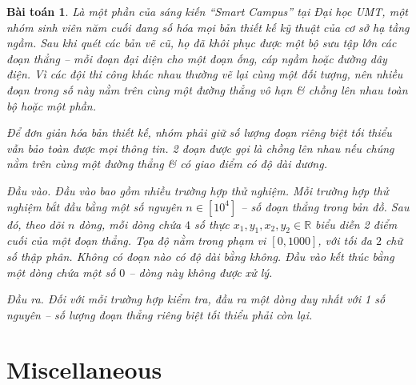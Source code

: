 \documentclass{article}
\newtheorem{baitoan}{Bài toán}
\begin{document}
 \begin{baitoan}
     Là một phần của sáng kiến ``Smart Campus'' tại Đại học UMT, một nhóm sinh viên năm cuối đang số hóa mọi bản thiết kế kỹ thuật của cơ sở hạ tầng ngầm. Sau khi quét các bản vẽ cũ, họ đã khôi phục được một bộ sưu tập lớn các đoạn thẳng -- mỗi đoạn đại diện cho một đoạn ống, cáp ngầm hoặc đường dây điện. Vì các đội thi công khác nhau thường vẽ lại cùng một đối tượng, nên nhiều đoạn trong số này nằm trên {\rm cùng một} đường thẳng vô hạn \& chồng lên nhau toàn bộ hoặc một phần.
     
     Để đơn giản hóa bản thiết kế, nhóm phải giữ {\rm số lượng đoạn riêng biệt tối thiểu} vẫn bảo toàn được mọi thông tin. 2 đoạn được gọi là {\rm chồng lên nhau} nếu chúng nằm trên cùng một đường thẳng \& có giao điểm có độ dài dương.
     \item {\sf Đầu vào.} Đầu vào bao gồm nhiều trường hợp thử nghiệm. Mỗi trường hợp thử nghiệm bắt đầu bằng một số nguyên $n\in[10^4]$ -- số đoạn thẳng trong bản đồ. Sau đó, theo dõi $n$ dòng, mỗi dòng chứa $4$ số thực $x_1,y_1,x_2,y_2\in\mathbb{R}$ biểu diễn 2 điểm cuối của một đoạn thẳng. Tọa độ nằm trong phạm vi $[0,1000]$, với tối đa $2$ chữ số thập phân. Không có đoạn nào có độ dài bằng không. Đầu vào kết thúc bằng một dòng chứa một số $0$ -- dòng này không được xử lý.
     \item {\sf Đầu ra.} Đối với mỗi trường hợp kiểm tra, đầu ra một dòng duy nhất với 1 số nguyên -- số lượng đoạn thẳng riêng biệt tối thiểu phải còn lại.
 \end{baitoan}
 


\section{Miscellaneous}


\printbibliography[heading=bibintoc]
    
\end{document}
